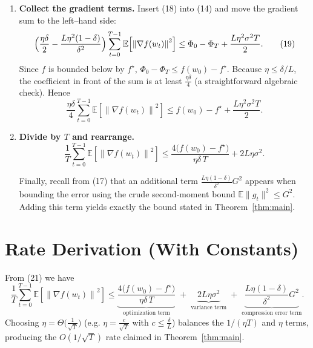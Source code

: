 \documentclass{article}
\newcommand{\E}{\mathbb{E}}
\newcommand{\norm}[1]{\left\|#1\right\|}
\begin{document}
\begin{enumerate}
\item[Step 11.] \textbf{Collect the gradient terms.}
Insert (18) into (14) and move the gradient sum to the left–hand side:
\[
\Bigl(\frac{\eta\delta}{2}
      -\frac{L\eta^{2}(1-\delta)}{\delta^{2}}\Bigr)
\sum_{t=0}^{T-1}\E\!\left[\norm{\nabla f(w_{t})}^{2}\right]
\le \Phi_{0}-\Phi_{T}
      +\frac{L\eta^{2}\sigma^{2}T}{2}. \tag{19}
\]
Since $f$ is bounded below by $f^{\star}$,
$\Phi_{0}-\Phi_{T}\le f(w_{0})-f^{\star}$.  
Because $\eta\le\delta/L$, the coefficient in front of the sum is at least
$\frac{\eta\delta}{4}$ (a straightforward algebraic check). Hence
\[
\frac{\eta\delta}{4}\sum_{t=0}^{T-1}\E\!\left[\norm{\nabla f(w_{t})}^{2}\right]
\le f(w_{0})-f^{\star}
     +\frac{L\eta^{2}\sigma^{2}T}{2}. \tag{20}
\]

\item[Step 12.] \textbf{Divide by $T$ and rearrange.}
\[
\frac{1}{T}\sum_{t=0}^{T-1}\E\!\left[\norm{\nabla f(w_{t})}^{2}\right]
\le
\frac{4\bigl(f(w_{0})-f^{\star}\bigr)}{\eta\delta\,T}
   +2L\eta\sigma^{2}. \tag{21}
\]

Finally, recall from (17) that an additional term
$\frac{L\eta(1-\delta)}{\delta^{2}}G^{2}$ appears when bounding the
error using the crude second‑moment bound $\E\|g_{t}\|^{2}\le G^{2}$.
Adding this term yields exactly the bound stated in Theorem~\ref{thm:main}.

\end{enumerate}

\section*{Rate Derivation (With Constants)}
From (21) we have
\[
\frac{1}{T}\sum_{t=0}^{T-1}\E\!\left[\norm{\nabla f(w_{t})}^{2}\right]
\le
\underbrace{\frac{4\bigl(f(w_{0})-f^{\star}\bigr)}{\eta\delta\,T}}_{\text{optimization term}}
\;+\;
\underbrace{2L\eta\sigma^{2}}_{\text{variance term}}
\;+\;
\underbrace{\frac{L\eta(1-\delta)}{\delta^{2}}G^{2}}_{\text{compression error term}} .
\]
Choosing $\eta = \Theta\!\bigl(\frac{1}{\sqrt{T}}\bigr)$ (e.g. $\eta = \frac{c}{\sqrt{T}}$
with $c\le\frac{\delta}{L}$) balances the $1/(\eta T)$ and $\eta$ terms,
producing the $O(1/\sqrt{T})$ rate claimed in Theorem~\ref{thm:main}.
\end{document}
